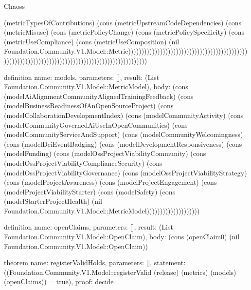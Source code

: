 \begin{lexlean}{Chaoss}
\begin{semanticmodule}
{(metricTypesOfContributions) (cons (metricUpstreamCodeDependencies) (cons (metricMisuse) (cons (metricPolicyChange) (cons (metricPolicySpecificity) (cons (metricUseCompliance) (cons (metricUseComposition) (nil Foundation.Community.V1.Model::Metric)))))))))))))))))))))))))))))))))))))))))))))))))))))))))))))))))))))))))))))))))))))))))))))))))))
}

definition{
  name: models,
  parameters: [],
  result: (List Foundation.Community.V1.Model::MetricModel),
  body: (cons (modelAiAlignmentCommunityAlignedTrainingFeedback) (cons (modelBusinessReadinessOfAnOpenSourceProject) (cons (modelCollaborationDevelopmentIndex) (cons (modelCommunityActivity) (cons (modelCommunityGovernedAiUseInOpenCommunities) (cons (modelCommunityServiceAndSupport) (cons (modelCommunityWelcomingness) (cons (modelDeiEventBadging) (cons (modelDevelopmentResponsiveness) (cons (modelFunding) (cons (modelOssProjectViabilityCommunity) (cons (modelOssProjectViabilityComplianceSecurity) (cons (modelOssProjectViabilityGovernance) (cons (modelOssProjectViabilityStrategy) (cons (modelProjectAwareness) (cons (modelProjectEngagement) (cons (modelProjectViabilityStarter) (cons (modelSafety) (cons (modelStarterProjectHealth) (nil Foundation.Community.V1.Model::MetricModel))))))))))))))))))))
}

definition{
  name: openClaims,
  parameters: [],
  result: (List Foundation.Community.V1.Model::OpenClaim),
  body: (cons (openClaim0) (nil Foundation.Community.V1.Model::OpenClaim))
}

theorem{
  name: registerValidHolds,
  parameters: [],
  statement: ((Foundation.Community.V1.Model::registerValid (release) (metrics) (models) (openClaims)) = true),
  proof: decide{}
}
\end{semanticmodule}
\end{lexlean}
